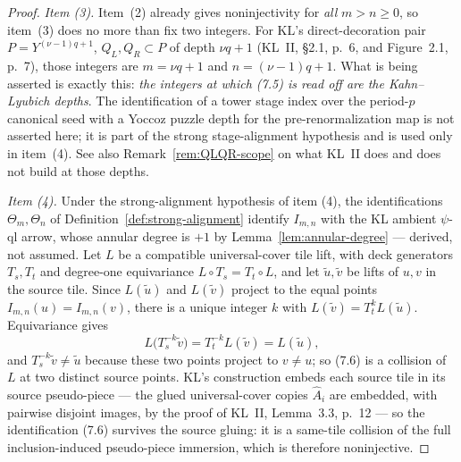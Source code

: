 \documentclass[11pt,reqno]{amsart}
\theoremstyle{definition}
\theoremstyle{remark}
\begin{document}
\begin{proof}
\emph{Item (3).}  Item~(2) already gives noninjectivity for \emph{all} \(m>n\ge0\), so item~(3) does no more than fix two integers.  For KL's direct-decoration pair \(P=Y^{(\nu-1)q+1}\), \(Q_L,Q_R\subset P\) of depth \(\nu q+1\) (KL~II, \S2.1, p.~6, and Figure~2.1, p.~7), those integers are \(m=\nu q+1\) and \(n=(\nu-1)q+1\).  What is being asserted is exactly this: \emph{the integers at which (7.5) is read off are the Kahn--Lyubich depths}.  The identification of a tower stage index over the period-\(p\) canonical seed with a Yoccoz puzzle depth for the pre-renormalization map is not asserted here; it is part of the strong stage-alignment hypothesis and is used only in item~(4).  See also Remark~\ref{rem:QLQR-scope} on what KL~II does and does not build at those depths.

\emph{Item (4).}  Under the strong-alignment hypothesis of item (4), the identifications \(\Theta_m,\Theta_n\) of Definition~\ref{def:strong-alignment} identify \(I_{m,n}\) with the KL ambient \(\psi\)-ql arrow, whose annular degree is \(+1\) by Lemma~\ref{lem:annular-degree} --- derived, not assumed.  Let \(L\) be a compatible universal-cover tile lift, with deck generators \(T_s,T_t\) and degree-one equivariance \(L\circ T_s=T_t\circ L\), and let \(\widetilde u,\widetilde v\) be lifts of \(u,v\) in the source tile.  Since \(L(\widetilde u)\) and \(L(\widetilde v)\) project to the equal points \(I_{m,n}(u)=I_{m,n}(v)\), there is a unique integer \(k\) with \(L(\widetilde v)=T_t^kL(\widetilde u)\).  Equivariance gives
\[
 L\bigl(T_s^{-k}\widetilde v\bigr)=T_t^{-k}L(\widetilde v)=L(\widetilde u),  \tag{7.6}
\]
and \(T_s^{-k}\widetilde v\ne\widetilde u\) because these two points project to \(v\ne u\); so (7.6) is a collision of \(L\) at two distinct source points.  KL's construction embeds each source tile in its source pseudo-piece --- the glued universal-cover copies \(\widehat A_i\) are embedded, with pairwise disjoint images, by the proof of KL~II, Lemma~3.3, p.~12 --- so the identification (7.6) survives the source gluing: it is a same-tile collision of the full inclusion-induced pseudo-piece immersion, which is therefore noninjective.
\end{proof}
\end{document}
